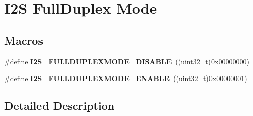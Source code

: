 \hypertarget{group___i2_s___full_duplex___mode}{}\section{I2S Full\+Duplex Mode}
\label{group___i2_s___full_duplex___mode}
\subsection*{Macros}
\begin{DoxyCompactItemize}
\item 
\#define {\bfseries I2\+S\+\_\+\+F\+U\+L\+L\+D\+U\+P\+L\+E\+X\+M\+O\+D\+E\+\_\+\+D\+I\+S\+A\+B\+LE}~((uint32\+\_\+t)0x00000000)\hypertarget{group___i2_s___full_duplex___mode_ga7da4a3f7309dacfd363893dced2cea9c}{}\label{group___i2_s___full_duplex___mode_ga7da4a3f7309dacfd363893dced2cea9c}

\item 
\#define {\bfseries I2\+S\+\_\+\+F\+U\+L\+L\+D\+U\+P\+L\+E\+X\+M\+O\+D\+E\+\_\+\+E\+N\+A\+B\+LE}~((uint32\+\_\+t)0x00000001)\hypertarget{group___i2_s___full_duplex___mode_ga48be599b5762d3c4e4c52ec3bb210938}{}\label{group___i2_s___full_duplex___mode_ga48be599b5762d3c4e4c52ec3bb210938}

\end{DoxyCompactItemize}


\subsection{Detailed Description}
